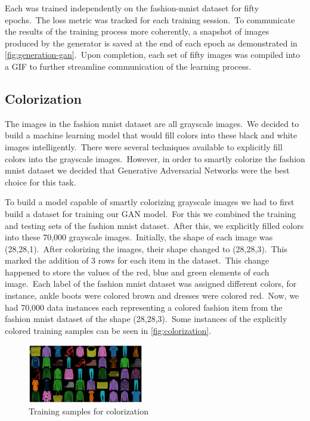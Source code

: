 \documentclass[conference]{IEEEtran}
\begin{document}
    Each was trained independently on the fashion-mnist dataset for fifty epochs.\ The loss metric was tracked for each training session.\ To communicate the results of the training process more coherently, a snapshot of images produced by the generator is saved at the end of each epoch as demonstrated in \autoref{fig:generation-gan}.\ Upon completion, each set of fifty images was compiled into a GIF to further streamline communication of the learning process.

    \subsection{Colorization}\label{subsec:implementation-colorization}

    The images in the fashion mnist dataset are all grayscale images.\ We decided to build a machine learning model that would fill colors into these black and white images intelligently.\ There were several techniques available to explicitly fill colors into the grayscale images.\ However, in order to smartly colorize the fashion mnist dataset we decided that Generative Adversarial Networks were the best choice for this task.

    To build a model capable of smartly colorizing grayscale images we had to first build a dataset for training our GAN model.\ For this we combined the training and testing sets of the fashion mnist dataset.\ After this, we explicitly filled colors into these 70,000 grayscale images.\ Initially, the shape of each image was (28,28,1).\ After colorizing the images, their shape changed to (28,28,3).\ This marked the addition of 3 rows for each item in the dataset.\ This change happened to store the values of the red, blue and green elements of each image.\ Each label of the fashion mnist dataset was assigned different colors, for instance, ankle boots were colored brown and dresses were colored red.\ Now, we had 70,000 data instances each representing a colored fashion item from the fashion mnist dataset of the shape (28,28,3).\ Some instances of the explicitly colored training samples can be seen in \autoref{fig:colorization}.

    \begin{figure}
        \caption{Training samples for colorization}
        \label{fig:colorization}
        \centering
        \includegraphics[width=0.45\textwidth]{Colorization_training_samples.png}
    \end{figure}
\end{document}
